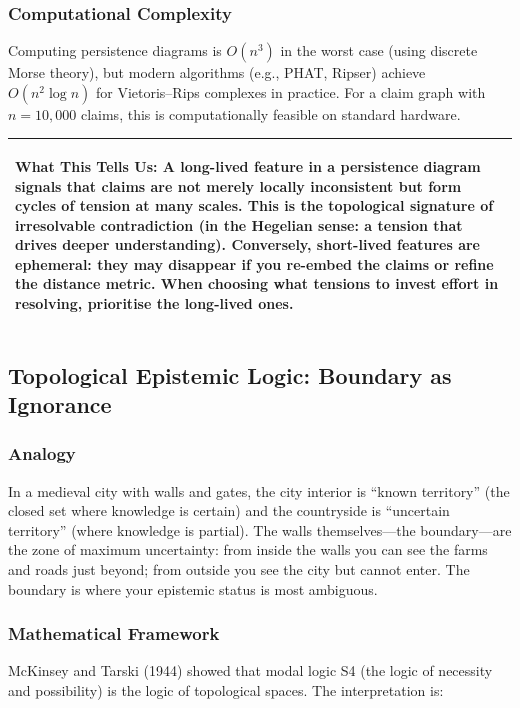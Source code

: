 \documentclass[11pt,letterpaper]{article}
\theoremstyle{definition}
\theoremstyle{remark}
\newenvironment{insightbox}{%
  \vspace{0.3cm}%
  \noindent\begin{tabular}{|p{\dimexpr\textwidth-4\tabcolsep-2\arrayrulewidth}|}
  \hline
  \small\itshape\color{accent}
}{%
  \\ \hline
  \end{tabular}
  \vspace{0.3cm}
}
\begin{document}
\subsubsection*{Computational Complexity}

Computing persistence diagrams is $O(n^3)$ in the worst case (using discrete Morse theory), but modern algorithms (e.g., PHAT, Ripser) achieve $O(n^2 \log n)$ for Vietoris--Rips complexes in practice. For a claim graph with $n = 10{,}000$ claims, this is computationally feasible on standard hardware.

\begin{insightbox}
\textbf{What This Tells Us:} A long-lived feature in a persistence diagram signals that claims are not merely locally inconsistent but form cycles of tension at many scales. This is the topological signature of irresolvable contradiction (in the Hegelian sense: a tension that drives deeper understanding). Conversely, short-lived features are ephemeral: they may disappear if you re-embed the claims or refine the distance metric. When choosing what tensions to invest effort in resolving, prioritise the long-lived ones.
\end{insightbox}

\subsection{Topological Epistemic Logic: Boundary as Ignorance}
\label{sec:topological-logic}

\subsubsection*{Analogy}

In a medieval city with walls and gates, the city interior is ``known territory'' (the closed set where knowledge is certain) and the countryside is ``uncertain territory'' (where knowledge is partial). The walls themselves---the boundary---are the zone of maximum uncertainty: from inside the walls you can see the farms and roads just beyond; from outside you see the city but cannot enter. The boundary is where your epistemic status is most ambiguous.

\subsubsection*{Mathematical Framework}

McKinsey and Tarski (1944) showed that modal logic S4 (the logic of necessity and possibility) is the logic of topological spaces. The interpretation is:
\end{document}
